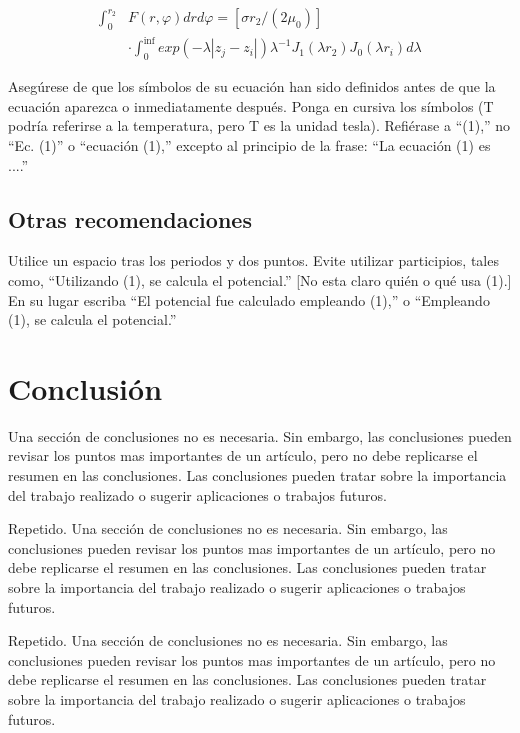 \documentclass[5p,times,authoryear]{elsarticle}
\begin{document}
\begin{equation} \label{e2}
\begin{array}{ll}
\int_0^{r_2} & F (r, \varphi ) dr d\varphi = [\sigma r_2 / (2 \mu_0 )] \\
& \cdot \int_0^{\inf} exp(-\lambda |z_j - z_i |) \lambda^{-1} J_1 (\lambda  r_2 ) J_0 (\lambda r_i ) d\lambda
\end{array}
\end{equation}

Asegúrese de que los símbolos de su ecuación han sido definidos antes de que la ecuación aparezca o inmediatamente después. Ponga en cursiva los símbolos (T podría referirse a la temperatura, pero T es la unidad tesla). Refiérase a ``(1),'' no ``Ec. (1)'' o ``ecuación (1),'' excepto al principio de la frase: ``La ecuación (1) es ....''

\subsection{Otras recomendaciones}

Utilice un espacio tras los periodos y dos puntos. Evite utilizar participios, tales como, ``Utilizando (1), se calcula el potencial.'' [No esta claro quién o qué usa (1).] En su lugar escriba ``El potencial fue calculado empleando (1),'' o ``Empleando (1), se calcula el potencial.''

\section{Conclusión}

Una sección de conclusiones no es necesaria. Sin embargo, las conclusiones pueden revisar los puntos mas importantes de un artículo, pero no debe replicarse el resumen en las conclusiones. Las conclusiones pueden tratar sobre la importancia del trabajo realizado o sugerir aplicaciones o trabajos futuros.

Repetido. Una sección de conclusiones no es necesaria. Sin embargo, las conclusiones pueden revisar los puntos mas importantes de un artículo, pero no debe replicarse el resumen en las conclusiones. Las conclusiones pueden tratar sobre la importancia del trabajo realizado o sugerir aplicaciones o trabajos futuros.

Repetido. Una sección de conclusiones no es necesaria. Sin embargo, las conclusiones pueden revisar los puntos mas importantes de un artículo, pero no debe replicarse el resumen en las conclusiones. Las conclusiones pueden tratar sobre la importancia del trabajo realizado o sugerir aplicaciones o trabajos futuros.
\end{document}
